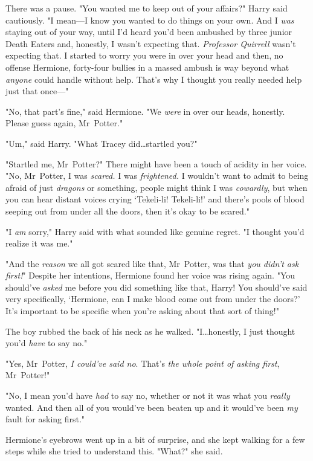 There was a pause. "You wanted me to keep out of your affairs?" Harry said
cautiously. "I mean—I know you wanted to do things on your own. And I
\emph{was} staying out of your way, until I'd heard you'd been ambushed by
three junior Death Eaters and, honestly, I wasn't expecting that.
\emph{Professor Quirrell} wasn't expecting that. I started to worry you
were in over your head and then, no offense Hermione, forty-four bullies in a
massed ambush is way beyond what \emph{anyone} could handle without help.
That's why I thought you really needed help just that once—"

"No, that part's fine," said Hermione. "We \emph{were} in over our heads,
honestly. Please guess again, Mr~Potter."

"Um," said Harry. "What Tracey did…startled you?"

"Startled me, Mr~Potter?" There might have been a touch of acidity in her
voice. "No, Mr~Potter, I was \emph{scared.} I was \emph{frightened.} I
wouldn't want to admit to being afraid of just \emph{dragons} or something,
people might think I was \emph{cowardly}, but when you can hear distant voices
crying `Tekeli-li! Tekeli-li!' and there's pools of blood seeping out from
under all the doors, then it's okay to be scared."

"I \emph{am} sorry," Harry said with what sounded like genuine regret. "I
thought you'd realize it was me."

"And the \emph{reason} we all got scared like that, Mr~Potter, was that
\emph{you didn't ask first!}" Despite her intentions, Hermione found her voice
was rising again. "You should've \emph{asked} me before you did something like
that, Harry! You should've said very specifically, `Hermione, can I make blood
come out from under the doors?' It's important to be specific when you're
asking about that sort of thing!"

The boy rubbed the back of his neck as he walked. "I…honestly, I just
thought you'd \emph{have} to say no."

"Yes, Mr~Potter, \emph{I could've said no}. That's \emph{the whole point of
asking first}, Mr~Potter!"

"No, I mean you'd have \emph{had} to say no, whether or not it was what you
\emph{really} wanted. And then all of you would've been beaten up and it
would've been \emph{my} fault for asking first."

Hermione's eyebrows went up in a bit of surprise, and she kept walking for a
few steps while she tried to understand this. "What?" she said.

